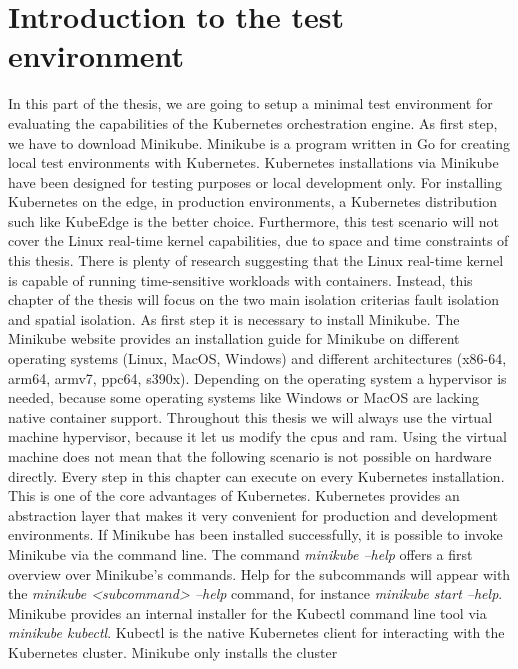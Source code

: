 \documentclass[titlepage]{report}
\begin{document}
\section{Introduction to the test environment}
In this part of the thesis, we are going to setup a minimal test environment for evaluating the capabilities of the Kubernetes orchestration engine. As first step, we have to
download Minikube. Minikube is a program written in Go for creating local test environments with Kubernetes\cite{Minikube}. Kubernetes installations via Minikube have been designed for testing purposes or local development only.
For installing Kubernetes on the edge, in production environments, a Kubernetes distribution such like KubeEdge\cite{KubeEdge} is the better choice. Furthermore, this test scenario will not cover the Linux real-time kernel capabilities, due to space and time constraints of this thesis.
There is plenty of research suggesting that the Linux real-time kernel is capable of running time-sensitive workloads with containers\cite{RTAI}\cite{cinque2018towards}\cite{frankel2021real}\cite{struhar2021react}\cite{fiori2022rt}\cite{RTLinux}\cite{cinque2017work}\cite{cinque2019rt}.
Instead, this chapter of the thesis will focus on the two main isolation criterias fault isolation and spatial isolation\cite{bredereke2017survey}. As first step it is necessary to install Minikube. The Minikube website
provides an installation guide for Minikube on different operating systems (Linux, MacOS, Windows) and different architectures (x86-64, arm64, armv7, ppc64, s390x)\cite{MinikubeDocsStart}. Depending
on the operating system a hypervisor is needed, because some operating systems like Windows or MacOS are lacking native container support. Throughout this thesis we will always use the virtual machine hypervisor, because it let us modify the \glspl{cpu} and \gls{ram}.
Using the virtual machine does not mean that the following scenario is not possible on hardware directly. Every step in this chapter can execute on every Kubernetes installation. This is one of the core advantages of Kubernetes.
Kubernetes provides an abstraction layer that makes it very convenient for production and development environments. If Minikube has been installed successfully, it is possible to invoke Minikube via the command line.
The command \emph{minikube --help} offers a first overview over Minikube's commands. Help for the subcommands will appear with the \emph{minikube <subcommand> --help} command, for instance \emph{minikube start --help}.
Minikube provides an internal installer for the Kubectl command line tool via \emph{minikube kubectl}. Kubectl is the native Kubernetes client for interacting with the Kubernetes cluster. Minikube only installs the cluster
\end{document}
